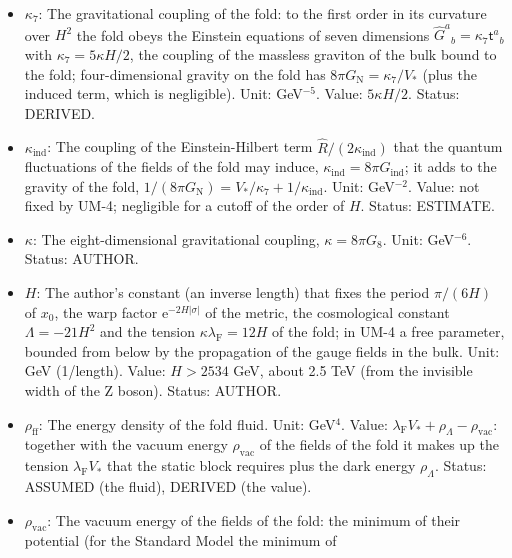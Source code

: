 \documentclass[
  10pt,
]{article}
\begin{document}
\begin{itemize}
  \(\mathrm{e}^{-a_4}b_4\) is constant; it converts the
  eight-dimensional normalisation into the four-dimensional one. Unit:
  length\(^3\) (GeV\(^{-3}\)). Status: ASSUMED.
\item
  \(\kappa_7\): The gravitational coupling of the fold: to the first
  order in its curvature over \(H^2\) the fold obeys the Einstein
  equations of seven dimensions
  \(\hat G^a{}_b = \kappa_7\mathsf{t}^a{}_b\) with
  \(\kappa_7 = 5\kappa H/2\), the coupling of the massless graviton of
  the bulk bound to the fold; four-dimensional gravity on the fold has
  \(8\pi G_{\mathrm{N}} = \kappa_7/V_*\) (plus the induced term, which
  is negligible). Unit: GeV\(^{-5}\). Value: \(5\kappa H/2\). Status:
  DERIVED.
\item
  \(\kappa_{\mathrm{ind}}\): The coupling of the Einstein-Hilbert term
  \(\hat R/(2\kappa_{\mathrm{ind}})\) that the quantum fluctuations of
  the fields of the fold may induce,
  \(\kappa_{\mathrm{ind}} = 8\pi G_{\mathrm{ind}}\); it adds to the
  gravity of the fold,
  \(1/(8\pi G_{\mathrm{N}}) = V_*/\kappa_7 + 1/\kappa_{\mathrm{ind}}\).
  Unit: GeV\(^{-2}\). Value: not fixed by UM-4; negligible for a cutoff
  of the order of \(H\). Status: ESTIMATE.
\item
  \(\kappa\): The eight-dimensional gravitational coupling,
  \(\kappa = 8\pi G_8\). Unit: GeV\(^{-6}\). Status: AUTHOR.
\item
  \(H\): The author's constant (an inverse length) that fixes the period
  \(\pi/(6H)\) of \(x_0\), the warp factor
  \(\mathrm{e}^{-2H\lvert\sigma\rvert}\) of the metric, the cosmological
  constant \(\Lambda = -21H^2\) and the tension
  \(\kappa\lambda_{\mathrm{F}} = 12H\) of the fold; in UM-4 a free
  parameter, bounded from below by the propagation of the gauge fields
  in the bulk. Unit: GeV (1/length). Value: \(H > 2534\) GeV, about 2.5
  TeV (from the invisible width of the Z boson). Status: AUTHOR.
\item
  \(\rho_{\mathrm{ff}}\): The energy density of the fold fluid. Unit:
  GeV\(^4\). Value:
  \(\lambda_{\mathrm{F}}V_* + \rho_\Lambda - \rho_{\mathrm{vac}}\):
  together with the vacuum energy \(\rho_{\mathrm{vac}}\) of the fields
  of the fold it makes up the tension \(\lambda_{\mathrm{F}}V_*\) that
  the static block requires plus the dark energy \(\rho_\Lambda\).
  Status: ASSUMED (the fluid), DERIVED (the value).
\item
  \(\rho_{\mathrm{vac}}\): The vacuum energy of the fields of the fold:
  the minimum of their potential (for the Standard Model the minimum of

\end{itemize}
\end{document}
